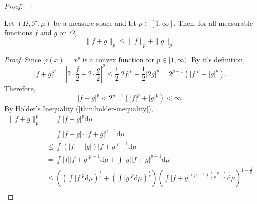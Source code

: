 \begin{proof}

\end{proof}

\begin{theorem} \label{thm:minkowski-inequality}
	Let $(\Omega,\mathcal{F},\mu)$ be a measure space and let $p\in[1,\infty]$. Then, for all measurable functions $f$ and $g$ on $\Omega$,
	\begin{equation}
		\|f+g\|_{p} \leq\|f\|_{p}+\|g\|_{p}.
	\end{equation}
\end{theorem}

\begin{proof}
	Since $\varphi(x)=x^p$ is a convex function for $p\in[1,\infty)$. By it's definition,
	\begin{equation*}
		|f+g|^{p}=\left|2\cdot\frac{f}{2}+2\cdot\frac{g}{2}\right|^{p}\leq \frac{1}{2}|2f|^p+\frac{1}{2}|2g|^p=2^{p-1}\left(|f|^{p}+|g|^{p}\right).
	\end{equation*}
	Therefore,
	\begin{equation*}
		|f+g|^{p}<2^{p-1}\left(|f|^{p}+|g|^{p}\right)<\infty.
	\end{equation*}
	By H\"older's Inequality (\ref{thm:holder-inequality}),
	\begin{equation*}
		\begin{aligned}
			\|f+g\|_{p}^{p} & =\int|f+g|^{p}\mathrm{d}\mu                                                                                                                                                                                         \\
			                & =\int|f+g| \cdot|f+g|^{p-1}\mathrm{d} \mu                                                                                                                                                                           \\
			                & \leq \int(|f|+|g|)|f+g|^{p-1}\mathrm{d}\mu                                                                                                                                                                          \\
			                & =\int|f||f+g|^{p-1}\mathrm{d}\mu+\int|g||f+g|^{p-1}\mathrm{d}\mu                                                                                                                                                    \\
			                & \leq\left(\left(\int|f|^{p} \mathrm{d} \mu\right)^{\frac{1}{p}}+\left(\int|g|^{p} \mathrm{d} \mu\right)^{\frac{1}{p}}\right)\left(\int|f+g|^{(p-1)\left(\frac{p}{p-1}\right)} \mathrm{d} \mu\right)^{1-\frac{1}{p}} \\

\end{aligned}
\end{equation*}
\end{proof}
